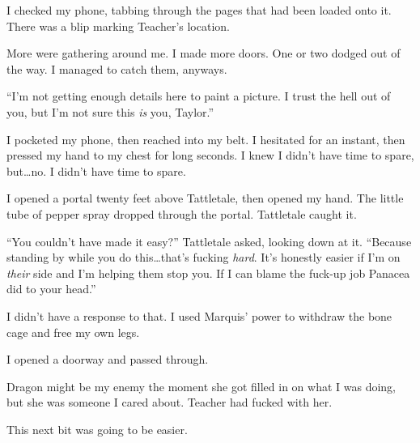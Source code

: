 I checked my phone, tabbing through the pages that had been loaded onto it.  There was a blip marking Teacher's location.



More were gathering around me.  I made more doors.  One or two dodged out of the way.  I managed to catch them, anyways.



``I'm not getting enough details here to paint a picture.  I trust the hell out of you, but I'm not sure this \emph{is} you, Taylor.''



I pocketed my phone, then reached into my belt.  I hesitated for an instant, then pressed my hand to my chest for long seconds.  I knew I didn't have time to spare, but\ldots  no.  I didn't have time to spare.



I opened a portal twenty feet above Tattletale, then opened my hand.  The little tube of pepper spray dropped through the portal.  Tattletale caught it.



``You couldn't have made it easy?''  Tattletale asked, looking down at it.  ``Because standing by while you do this\ldots that's fucking \emph{hard}.  It's honestly easier if I'm on \emph{their} side and I'm helping them stop you.  If I can blame the fuck-up job Panacea did to your head.''



I didn't have a response to that.  I used Marquis' power to withdraw the bone cage and free my own legs.



I opened a doorway and passed through.



Dragon might be my enemy the moment she got filled in on what I was doing, but she was someone I cared about.  Teacher had fucked with her.



This next bit was going to be easier.





